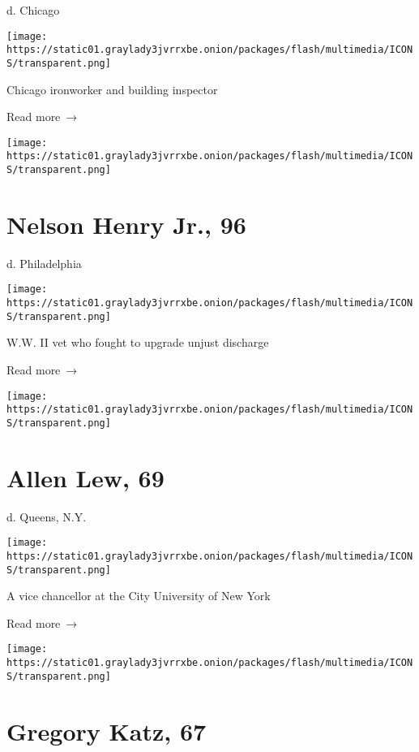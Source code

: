 d. Chicago

\texttt{[image: https://static01.graylady3jvrrxbe.onion/packages/flash/multimedia/ICONS/transparent.png]}

Chicago ironworker and building inspector

 Read more~→

\href{https://www.nytimes3xbfgragh.onion/2020/07/01/obituaries/nelson-henry-dead-coronavirus.html}{}

\texttt{[image: https://static01.graylady3jvrrxbe.onion/packages/flash/multimedia/ICONS/transparent.png]}

\hypertarget{nelson-henry-jr-96}{%
\section{Nelson Henry Jr., 96}\label{nelson-henry-jr-96}}

d. Philadelphia

\texttt{[image: https://static01.graylady3jvrrxbe.onion/packages/flash/multimedia/ICONS/transparent.png]}

W.W. II vet who fought to upgrade unjust discharge

 Read more~→

\href{https://www.nytimes3xbfgragh.onion/2020/07/01/obituaries/allen-lew-dead-coronavirus.html}{}

\texttt{[image: https://static01.graylady3jvrrxbe.onion/packages/flash/multimedia/ICONS/transparent.png]}

\hypertarget{allen-lew-69}{%
\section{Allen Lew, 69}\label{allen-lew-69}}

d. Queens, N.Y.

\texttt{[image: https://static01.graylady3jvrrxbe.onion/packages/flash/multimedia/ICONS/transparent.png]}

A vice chancellor at the City University of New York

 Read more~→

\href{https://www.nytimes3xbfgragh.onion/2020/07/01/obituaries/gregory-katz-dead-coronavirus.html}{}

\texttt{[image: https://static01.graylady3jvrrxbe.onion/packages/flash/multimedia/ICONS/transparent.png]}

\hypertarget{gregory-katz-67}{%
\section{Gregory Katz, 67}\label{gregory-katz-67}}

